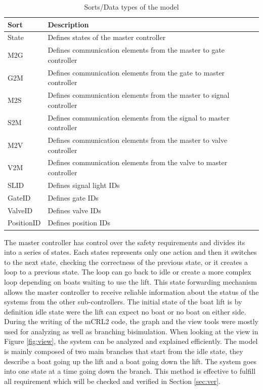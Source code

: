 \begin{table}[htbp]
	\centering
	\caption{Sorts/Data types of the model}
	\begin{tabular}{lp{10.5cm}l}
		\toprule
		\textbf{Sort} &  \textbf{Description} \\
		\hline
		State&  Defines states of the master controller \\
		M2G &  Defines communication elements from the master to gate controller\\
		G2M & Defines communication elements from the gate to master controller \\
		M2S &  Defines communication elements from the master to signal controller\\
		S2M &  Defines communication elements from the signal to master controller\\
		M2V &  Defines communication elements from the master to valve controller\\
		V2M &  Defines communication elements from the valve to master controller\\
		SLID &  Defines signal light IDs\\
		GateID &  Defines gate IDs\\
		ValveID &  Defines valve IDs\\
		PositionID   & Defines position IDs\\
		
	\end{tabular}%
	\label{tab:sort}%
\end{table}%
The master controller has control over the safety requirements and divides its into a series of states. Each states represents only one action and then it switches to the next state, checking the correctness of the previous state, or it creates a loop to a previous state. The loop can go back to idle or create a more complex loop depending on boats waiting to use the lift. This state forwarding mechanism allows the master controller to receive reliable information about the status of the systems from the other sub-controllers. The initial state of the boat lift is by definition idle state were the lift can expect no boat or no boat on either side.\\
During the writing of the mCRL2 code, the graph and the view tools were mostly used for analyzing as well as branching bisimulation. When looking at the view in Figure \ref{fig:view}, the system can be analyzed and explained efficiently. The model is mainly composed of two main branches that start from the idle state, they describe a boat going up the lift and a boat going down the lift. The system goes into one state at a time going down the branch. This method is effective to fulfill all requirement which will be checked and verified in Section \ref{sec:ver}. 

